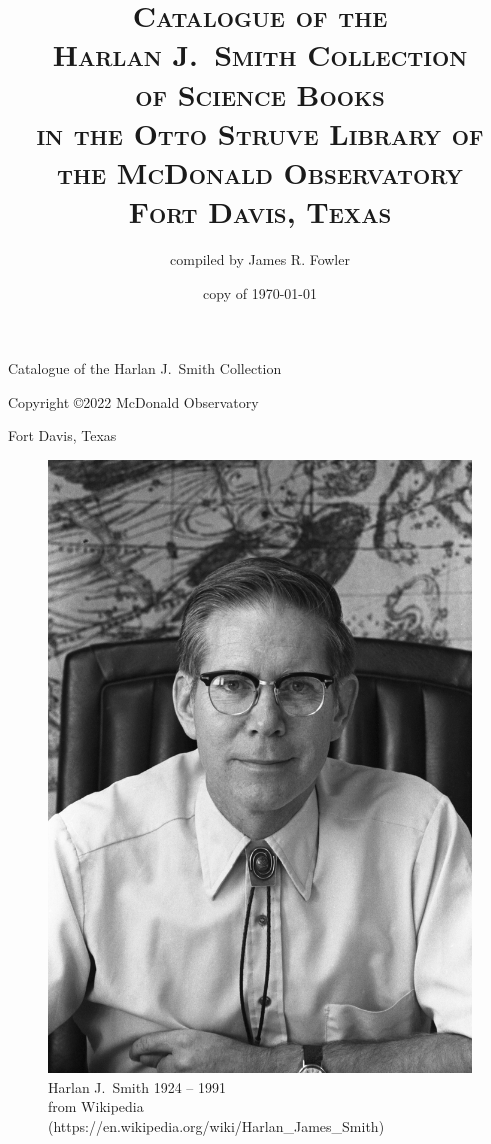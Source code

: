 \documentclass[letterpaper]{book}
\begin{document}
\frontmatter
\thispagestyle{empty}
\vspace*{1 in}
{\center\Large Catalogue of the Harlan J.~Smith Collection}
\newpage

\thispagestyle{empty}
\title{\textsc{Catalogue of the \\
    Harlan J.\ Smith Collection \\
    of Science Books \\
    in the Otto Struve Library of \\
    the McDonald Observatory \\
    Fort Davis, Texas}}
\author{compiled by James R. Fowler}
\date{copy of \today}
\maketitle
\newpage
\thispagestyle{empty}
\vspace*{5 in}
\centerline{Copyright \copyright 2022 McDonald Observatory}
\centerline{Fort Davis, Texas}
\newpage

\thispagestyle{empty}
\begin{figure}[t]
  \centering
  \includegraphics{hjs_photo.jpg}
  Harlan J.~Smith 1924 -- 1991 \\
  {\scriptsize from Wikipedia
  (https://en.wikipedia.org/wiki/Harlan\_James\_Smith)}
  \label{fig:hjs}
\end{figure}
\clearpage
\mbox{}
\thispagestyle{empty}
\newpage
\end{document}
